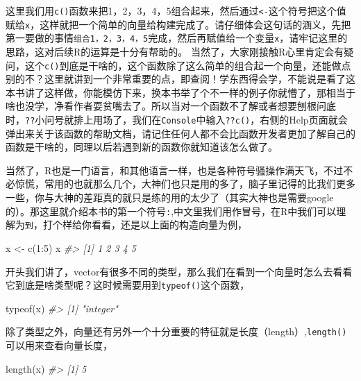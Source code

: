 \documentclass[
]{book}
\newenvironment{Shaded}{\begin{snugshade}}{\end{snugshade}}
\newcommand{\CommentTok}[1]{\textcolor[rgb]{0.56,0.35,0.01}{\textit{#1}}}
\newcommand{\DecValTok}[1]{\textcolor[rgb]{0.00,0.00,0.81}{#1}}
\newcommand{\FunctionTok}[1]{\textcolor[rgb]{0.00,0.00,0.00}{#1}}
\newcommand{\NormalTok}[1]{#1}
\newcommand{\OtherTok}[1]{\textcolor[rgb]{0.56,0.35,0.01}{#1}}
\newcommand{\SpecialCharTok}[1]{\textcolor[rgb]{0.00,0.00,0.00}{#1}}
\begin{document}
这里我们用\texttt{c()}函数来把1，2，3，4，5组合起来，然后通过\texttt{\textless{}-}这个符号把这个值赋给\texttt{x}，这样就把一个简单的向量给构建完成了。请仔细体会这句话的涵义，先把第一要做的事情\texttt{组合1，2，3，4，5}完成，然后再赋值给一个变量\texttt{x}，请牢记这里的思路，这对后续R的运算是十分有帮助的。
当然了，大家刚接触R心里肯定会有疑问，这个\texttt{c()}到底是干啥的，这个函数除了这么简单的组合起一个向量，还能做点别的不？这里就讲到一个非常重要的点，即查阅！学东西得会学，不能说是看了这本书讲了这样做，你能模仿下来，换本书举了个不一样的例子你就懵了，那相当于啥也没学，净看作者耍贫嘴去了。所以当对一个函数不了解或者想要刨根问底时，\texttt{??}小问号就排上用场了，我们在\texttt{Console}中输入\texttt{??c()}，右侧的Help页面就会弹出来关于该函数的帮助文档，请记住任何人都不会比函数开发者更加了解自己的函数是干啥的，同理以后若遇到新的函数你就知道该怎么做了。

当然了，R也是一门语言，和其他语言一样，也是各种符号骚操作满天飞，不过不必惊慌，常用的也就那么几个，大神们也只是用的多了，脑子里记得的比我们更多一些，你与大神的差距真的就只是练的用的太少了（其实大神也是需要google的）。那这里就介绍本书的第一个符号\texttt{:},中文里我们用作冒号，在R中我们可以理解为\texttt{到}，打个样给你看看，还是以上面的构造向量为例，

\begin{Shaded}
\begin{Highlighting}[]
\NormalTok{x }\OtherTok{\textless{}{-}} \FunctionTok{c}\NormalTok{(}\DecValTok{1}\SpecialCharTok{:}\DecValTok{5}\NormalTok{)}
\NormalTok{x}
\CommentTok{\#\textgreater{} [1] 1 2 3 4 5}
\end{Highlighting}
\end{Shaded}

开头我们讲了，vector有很多不同的类型，那么我们在看到一个向量时怎么去看看它到底是啥类型呢？这时候需要用到\texttt{typeof()}这个函数，

\begin{Shaded}
\begin{Highlighting}[]
\FunctionTok{typeof}\NormalTok{(x)}
\CommentTok{\#\textgreater{} [1] "integer"}
\end{Highlighting}
\end{Shaded}

除了类型之外，向量还有另外一个十分重要的特征就是长度（length）,\texttt{length()}可以用来查看向量长度，

\begin{Shaded}
\begin{Highlighting}[]
\FunctionTok{length}\NormalTok{(x)}
\CommentTok{\#\textgreater{} [1] 5}
\end{Highlighting}
\end{Shaded}
\end{document}
